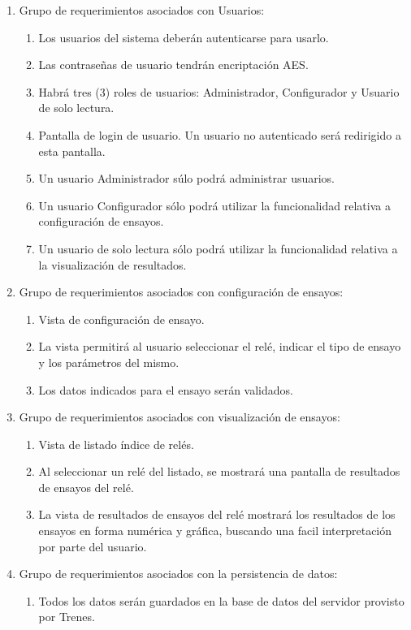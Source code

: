 \documentclass[11pt]{charter}
\begin{document}
\begin{enumerate}

\item Grupo de requerimientos asociados con Usuarios:
	\begin{enumerate}
	\item Los usuarios del sistema deberán autenticarse para usarlo.
	\item Las contraseñas de usuario tendrán encriptación AES.
	\item Habrá tres (3) roles de usuarios: Administrador, Configurador y Usuario de solo lectura.
	\item Pantalla de login de usuario. Un usuario no autenticado será redirigido a esta pantalla.
	\item Un usuario Administrador súlo podrá administrar usuarios.
	\item Un usuario Configurador sólo podrá utilizar la funcionalidad relativa a configuración de ensayos. 
	\item Un usuario de solo lectura sólo podrá utilizar la funcionalidad relativa a la visualización de resultados.
	\end{enumerate}

\item Grupo de requerimientos asociados con configuración de ensayos:
	\begin{enumerate}
	\item Vista de configuración de ensayo.
	\item La vista permitirá al usuario seleccionar el relé, indicar el tipo de ensayo y los parámetros del mismo.
	\item Los datos indicados para el ensayo serán validados.
	\end{enumerate}

\item Grupo de requerimientos asociados con visualización de ensayos:
	\begin{enumerate}
	\item Vista de listado índice de relés.
	\item Al seleccionar un relé del listado, se mostrará una pantalla de resultados de ensayos del relé.
	\item La vista de resultados de ensayos del relé mostrará los resultados de los ensayos en forma numérica y gráfica, buscando una facil interpretación por parte del usuario.
	\end{enumerate}

\item Grupo de requerimientos asociados con la persistencia de datos:
	\begin{enumerate}
	\item Todos los datos serán guardados en la base de datos del servidor provisto por Trenes.
	\end{enumerate}
	
\end{enumerate}
\end{document}
